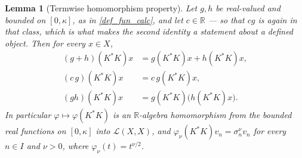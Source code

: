 \documentclass[a4paper]{report}
\theoremstyle{plain}
\newtheorem{lemma}[theorem]{Lemma}
\theoremstyle{definition}
\theoremstyle{remark}
\begin{document}
\begin{lemma}[Termwise homomorphism property]
  \label{lem_fun_calc_hom}
  Let $g,h$ be real-valued and bounded on $[0,\kappa]$, as in \cref{def_fun_calc}, and let
  $c \in \mathbb{R}$ --- so that $cg$ is again in that class, which is what makes the
  second identity a statement about a defined object.  Then for \emph{every} $x \in X$,
  \begin{align*}
    (g+h)(K^*K)x &= g(K^*K)x + h(K^*K)x, \\
    (c\,g)(K^*K)x &= c\,g(K^*K)x, \\
    (gh)(K^*K)x &= g(K^*K)\bigl(h(K^*K)x\bigr) .
  \end{align*}
  In particular $\varphi \mapsto \varphi(K^*K)$ is an $\mathbb{R}$-algebra homomorphism
  from the bounded real functions on $[0,\kappa]$ into $\mathcal{L}(X,X)$, and
  $\varphi_\nu(K^*K)v_n = \sigma_n^\nu v_n$ for every $n \in I$ and $\nu > 0$, where
  $\varphi_\nu(t) = t^{\nu/2}$.
\end{lemma}
\end{document}
